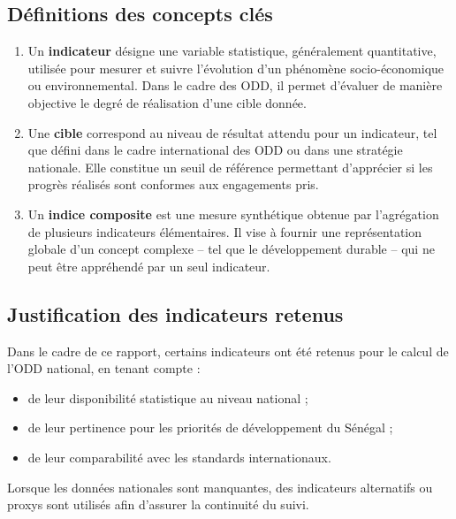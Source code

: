 \subsection{Définitions des concepts clés}
\vspace{0.5cm}
\begin{simplebox}
\begin{enumerate}
	\item Un \textbf{indicateur} désigne une variable statistique, généralement quantitative, utilisée pour mesurer et suivre l’évolution d’un phénomène socio-économique ou environnemental. Dans le cadre des ODD, il permet d’évaluer de manière objective le degré de réalisation d’une cible donnée.
	
	\item Une \textbf{cible} correspond au niveau de résultat attendu pour un indicateur, tel que défini dans le cadre international des ODD ou dans une stratégie nationale. Elle constitue un seuil de référence permettant d’apprécier si les progrès réalisés sont conformes aux engagements pris.
	
	\item Un \textbf{indice composite} est une mesure synthétique obtenue par l’agrégation de plusieurs indicateurs élémentaires. Il vise à fournir une représentation globale d’un concept complexe – tel que le développement durable – qui ne peut être appréhendé par un seul indicateur.
\end{enumerate}
\end{simplebox}

 
 


\subsection{Justification des indicateurs retenus}

Dans le cadre de ce rapport, certains indicateurs ont été retenus pour le calcul de l’ODD national, en tenant compte :  
\begin{itemize}
	\item de leur disponibilité statistique au niveau national ;
	\item de leur pertinence pour les priorités de développement du Sénégal ;
	\item de leur comparabilité avec les standards internationaux.
\end{itemize}

Lorsque les données nationales sont manquantes, des indicateurs alternatifs ou proxys sont utilisés afin d’assurer la continuité du suivi.






